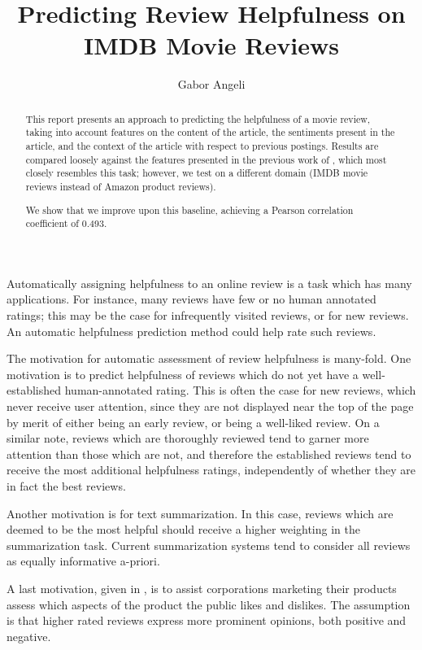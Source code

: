\documentclass[letter,10pt]{article}
\title{Predicting Review Helpfulness on IMDB Movie Reviews}
\author{Gabor Angeli}
\begin{document}
\maketitle

\begin{abstract}
This report presents an approach to predicting the helpfulness of a 
	movie review, taking into account features on the content of the article, 
	the sentiments present in the article, and the context of the article
	with respect to previous postings.
Results are compared loosely against the features presented in
	the previous work of 
	, which most closely resembles this task;
	however, we test on a different domain (IMDB movie
	reviews instead of Amazon product reviews).

We show that we improve upon this baseline, achieving a Pearson correlation
	coefficient of 0.493.
\end{abstract}

Automatically assigning helpfulness to an online review is a task which has
	many applications.
For instance, many reviews have few or no human annotated ratings; this
	may be the case for infrequently visited reviews, or for new reviews.
An automatic helpfulness prediction method could help rate such reviews.

The motivation for automatic assessment of review helpfulness is many-fold.
One motivation is to predict helpfulness of reviews which do not yet have 
	a well-established human-annotated rating.
This is often the case for new reviews, which never receive user attention, 
	since they are not displayed near the top of the page by merit of either 
	being an early review, or being a well-liked review.
On a similar note, reviews which are thoroughly reviewed tend to garner 
	more attention than those which are not, and therefore the established 
	reviews tend to receive the most additional helpfulness ratings,
	independently of whether they are in fact the best reviews.

Another motivation is for text summarization.
In this case, reviews which are deemed to be the most helpful should receive 
	a higher weighting in the summarization task. 
Current summarization systems tend to consider all reviews as 
	equally informative a-priori.

A last motivation, given in , is to 
	assist corporations marketing their products assess which aspects of the 
	product the public likes and dislikes.
The assumption is that higher rated reviews express more prominent opinions, 
	both positive and negative.
\end{document}
